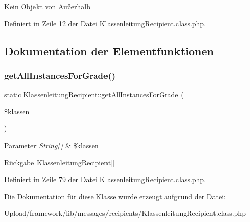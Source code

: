 Kein Objekt von Außerhalb 

Definiert in Zeile 12 der Datei Klassenleitung\+Recipient.\+class.\+php.



\subsection{Dokumentation der Elementfunktionen}
\mbox{\label{class_klassenleitung_recipient_a7e68063547dc964131b622fd5e11e9ba}} 
\subsubsection{\texorpdfstring{get\+All\+Instances\+For\+Grade()}{getAllInstancesForGrade()}}
{\footnotesize\ttfamily static Klassenleitung\+Recipient\+::get\+All\+Instances\+For\+Grade (\begin{DoxyParamCaption}\item[{}]{\$klassen }\end{DoxyParamCaption})\hspace{0.3cm}{\ttfamily [static]}}


\begin{DoxyParams}{Parameter}
{\em String\mbox{[}$\,$\mbox{]}} & \$klassen \\
\hline
\end{DoxyParams}
\begin{DoxyReturn}{Rückgabe}
\mbox{\hyperlink{class_klassenleitung_recipient}{Klassenleitung\+Recipient}}\mbox{[}\mbox{]} 
\end{DoxyReturn}


Definiert in Zeile 79 der Datei Klassenleitung\+Recipient.\+class.\+php.



Die Dokumentation für diese Klasse wurde erzeugt aufgrund der Datei\+:\begin{DoxyCompactItemize}
\item 
Upload/framework/lib/messages/recipients/Klassenleitung\+Recipient.\+class.\+php\end{DoxyCompactItemize}
